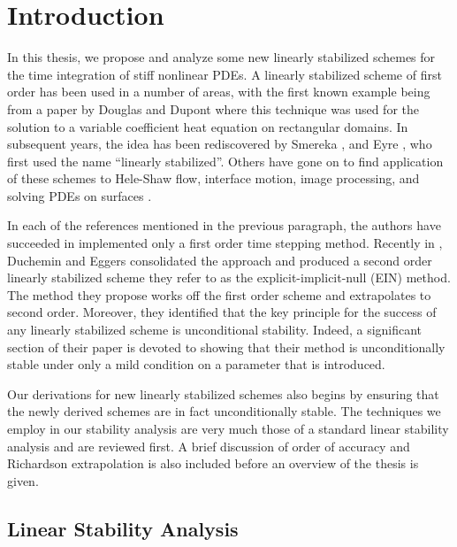 \chapter{Introduction}
In this thesis, we propose and analyze some new linearly stabilized schemes for the time integration of stiff nonlinear PDEs. A linearly stabilized scheme of first order has been used in a number of areas, with the first known example being from a paper by Douglas and Dupont \cite{douglas1971alternating} where this technique was used for the solution to a variable coefficient heat equation on rectangular domains. In subsequent years, the idea has been rediscovered by Smereka \cite{smereka2003semi}, and  Eyre \cite{eyre1998bunconditionally}, who first used the name ``linearly stabilized''. Others have gone on to find application of these schemes to Hele-Shaw flow, interface motion, image processing, and solving PDEs on surfaces \cite{eyre1998bunconditionally,salac2008local,glasner2002diffuse,schonlieb2011unconditionally,macdonald2009implicit}.

In each of the references mentioned in the previous paragraph, the authors have succeeded in implemented only a first order time stepping method. Recently in \cite{duchemin2014explicit},  Duchemin and Eggers consolidated the approach and produced a second order linearly stabilized scheme they refer to as the explicit-implicit-null (EIN) method. The method they propose works off the first order scheme and extrapolates to second order. Moreover, they identified that the key principle for the success of any linearly stabilized scheme is unconditional stability. Indeed, a significant section of their paper is devoted to showing that their method is unconditionally stable under only a mild condition on a parameter that is introduced.

Our derivations for new linearly stabilized schemes also begins by ensuring that the newly derived schemes are in fact unconditionally stable. The techniques we employ in our stability analysis are very much those of a standard linear stability analysis and are reviewed first. A brief discussion of order of accuracy and Richardson extrapolation is also included before an overview of the thesis is given.

\section{Linear Stability Analysis}
